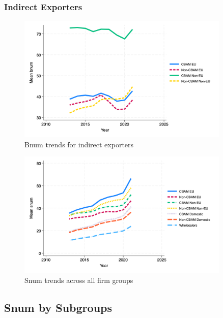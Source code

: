 \documentclass{article}
\begin{document}
\subsubsection{Indirect Exporters}
\begin{figure}[h!]
\centering
\includegraphics[width=0.9\textwidth]{bnum_indir.png}
\caption{Bnum trends for indirect exporters}
\label{fig:bnum_indir}
\end{figure}

\begin{figure}[h!]
\centering
\includegraphics[width=0.9\textwidth]{snum_main_groups.png}
\caption{Snum trends across all firm groups}
\label{fig:snum_main}
\end{figure}

\subsection{Snum by Subgroups}
\end{document}
